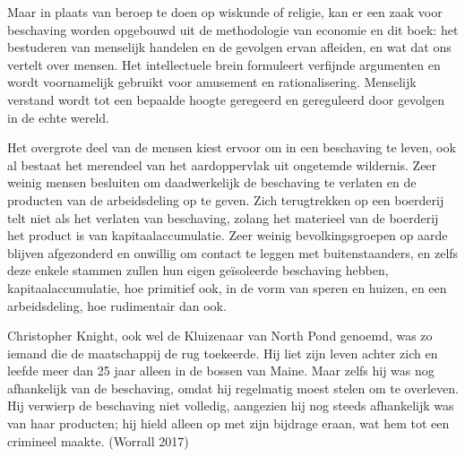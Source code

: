 \documentclass[
  a5paper,
  smalldemyvopaper,11pt,twoside,onecolumn,openright,extrafontsizes,
hidelinks]{memoir}
\begin{document}
Maar in plaats van beroep te doen op wiskunde of religie, kan er een
zaak voor beschaving worden opgebouwd uit de methodologie van economie
en dit boek: het bestuderen van menselijk handelen en de gevolgen ervan
afleiden, en wat dat ons vertelt over mensen. Het intellectuele brein
formuleert verfijnde argumenten en wordt voornamelijk gebruikt voor
amusement en rationalisering. Menselijk verstand wordt tot een bepaalde
hoogte geregeerd en gereguleerd door gevolgen in de echte wereld.

Het overgrote deel van de mensen kiest ervoor om in een beschaving te
leven, ook al bestaat het merendeel van het aardoppervlak uit ongetemde
wildernis. Zeer weinig mensen besluiten om daadwerkelijk de beschaving
te verlaten en de producten van de arbeidsdeling op te geven. Zich
terugtrekken op een boerderij telt niet als het verlaten van beschaving,
zolang het materieel van de boerderij het product is van
kapitaalaccumulatie. Zeer weinig bevolkingsgroepen op aarde blijven
afgezonderd en onwillig om contact te leggen met buitenstaanders, en
zelfs deze enkele stammen zullen hun eigen geïsoleerde beschaving
hebben, kapitaalaccumulatie, hoe primitief ook, in de vorm van speren en
huizen, en een arbeidsdeling, hoe rudimentair dan ook.

Christopher Knight, ook wel de Kluizenaar van North Pond genoemd, was zo
iemand die de maatschappij de rug toekeerde. Hij liet zijn leven achter
zich en leefde meer dan 25 jaar alleen in de bossen van Maine. Maar
zelfs hij was nog afhankelijk van de beschaving, omdat hij regelmatig
moest stelen om te overleven. Hij verwierp de beschaving niet volledig,
aangezien hij nog steeds afhankelijk was van haar producten; hij hield
alleen op met zijn bijdrage eraan, wat hem tot een crimineel maakte.
(Worrall 2017)
\end{document}
